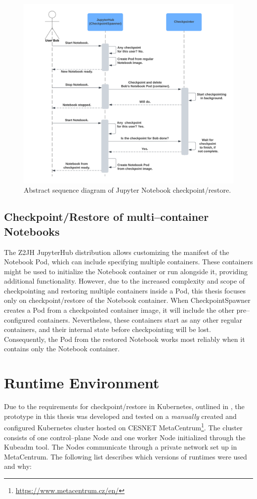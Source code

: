 \documentclass[
  digital,     %
  oneside,     %
  nosansbold,  %
  nocolorbold, %
  lof,         %
  nolot,         %
]{fithesis4}
\begin{document}
\begin{figure}[H]
  \begin{center}
  \includegraphics[width=\textwidth]{figures/checkpoint-highlevel.png}
  \end{center}
  \caption{Abstract sequence diagram of Jupyter Notebook checkpoint/restore.}
  \label{fig:checkpoint-highlevel}
\end{figure}

\subsection{Checkpoint/Restore of multi--container Notebooks}
The Z2JH JupyterHub distribution allows customizing the manifest of the Notebook Pod, which can include specifying multiple containers. These containers might be used to initialize the Notebook container or run alongside it, providing additional functionality. However, due to the increased complexity and scope of checkpointing and restoring multiple containers inside a Pod, this thesis focuses only on checkpoint/restore of the Notebook container. When CheckpointSpawner creates a Pod from a checkpointed container image, it will include the other pre--configured containers. Nevertheless, these containers start as any other regular containers, and their internal state before checkpointing will be lost. Consequently, the Pod from the restored Notebook works most reliably when it contains only the Notebook container.


\section{Runtime Environment}
\label{sec:runtime-env}
Due to the requirements for checkpoint/restore in Kubernetes, outlined in , the prototype in this thesis was developed and tested on a \emph{manually} created and configured Kubernetes cluster hosted on CESNET MetaCentrum\footnote{\url{https://www.metacentrum.cz/en/}}. The cluster consists of one control--plane Node and one worker Node initialized through the Kubeadm tool. The Nodes communicate through a private network set up in MetaCentrum. The following list describes which versions of runtimes were used and why:
\end{document}
